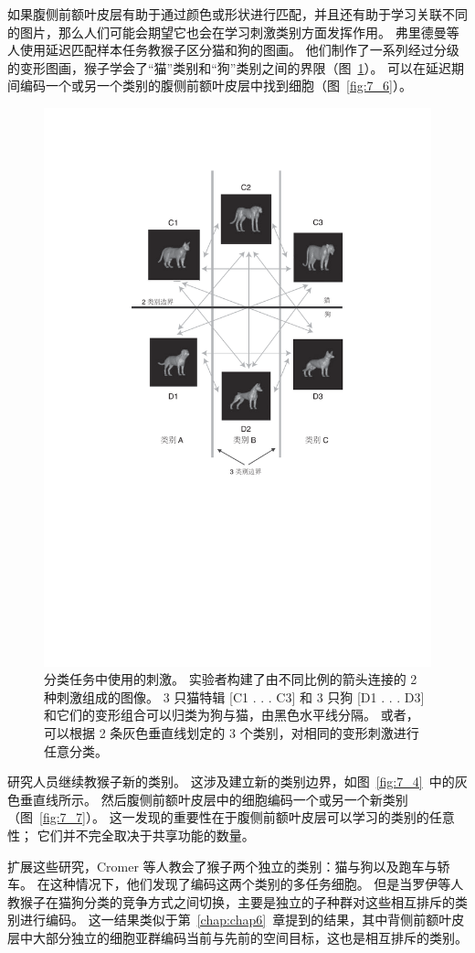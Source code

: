 如果腹侧前额叶皮层有助于通过颜色或形状进行匹配，并且还有助于学习关联不同的图片，那么人们可能会期望它也会在学习刺激类别方面发挥作用。 
弗里德曼等人\cite{freedman2001categorical,freedman2002visual}使用延迟匹配样本任务教猴子区分猫和狗的图画。 
他们制作了一系列经过分级的变形图画，猴子学会了“猫”类别和“狗”类别之间的界限（图~\ref{fig:7_5}）。
可以在延迟期间编码一个或另一个类别的腹侧前额叶皮层中找到细胞（图~\ref{fig:7_6}）。


\begin{figure}
	\centering
	\includegraphics[width=0.6\linewidth]{chap7/7_5}
	\caption{分类任务中使用的刺激。
		实验者构建了由不同比例的箭头连接的 2 种刺激组成的图像。 
		3 只猫特辑 [C1 . . . C3] 和 3 只狗 [D1 . . . D3] 和它们的变形组合可以归类为狗与猫，由黑色水平线分隔。
		或者，可以根据 2 条灰色垂直线划定的 3 个类别，对相同的变形刺激进行任意分类\cite{freedman2002visual}。 \label{fig:7_5}}
\end{figure}
\par


研究人员继续教猴子新的类别。 
这涉及建立新的类别边界，如图~\ref{fig:7_4}~中的灰色垂直线所示。 
然后腹侧前额叶皮层中的细胞编码一个或另一个新类别（图~\ref{fig:7_7}）。 
这一发现的重要性在于腹侧前额叶皮层可以学习的类别的任意性；
它们并不完全取决于共享功能的数量。
\par


扩展这些研究，Cromer 等人\cite{cromer2010representation}教会了猴子两个独立的类别：猫与狗以及跑车与轿车。
在这种情况下，他们发现了编码这两个类别的多任务细胞。 
但是当罗伊等人\cite{roy2010prefrontal}教猴子在猫狗分类的竞争方式之间切换，主要是独立的子种群对这些相互排斥的类别进行编码。 
这一结果类似于第~\ref{chap:chap6}~章提到的结果，其中背侧前额叶皮层中大部分独立的细胞亚群编码当前与先前的空间目标，这也是相互排斥的类别\cite{genovesio2006representation}。
\par



